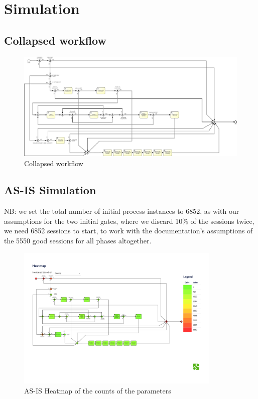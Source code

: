 \section{Simulation}
\label{sec:simulation}

\subsection{Collapsed workflow}

\begin{figure}[H]
\centering
\includegraphics[width=1\textwidth]{figures/Collapsed Workflow SIM.pdf}
\caption{Collapsed workflow}
\label{fig:collapsed_workflow}
\end{figure}

\subsection{AS-IS Simulation}
\label{sec:as_is_simulation}

NB: we set the total number of initial process instances to 6852,
as with our assumptions for the two
initial gates, where we discard 10\% of the sessions twice, we need 6852 sessions to start, to work with
the documentation's assumptions of the 5550 good sessions for all phases altogether.

\begin{figure}[H]
    \centering
    \includegraphics[width=0.87\textwidth]{figures/AS-IS heatmap_counts.pdf}
    \caption{AS-IS Heatmap of the counts of the parameters}
    \label{fig:as_is_heatmap_counts}
\end{figure}


